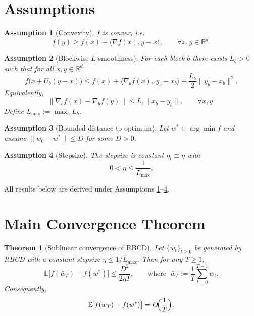 \documentclass[11pt]{article}
\newtheorem{theorem}{Theorem}
\newtheorem{assumption}{Assumption}
\newcommand{\E}{\mathbb{E}}
\newcommand{\R}{\mathbb{R}}
\begin{document}
\section*{Assumptions}
\begin{assumption}[Convexity]\label{ass:convex}
$f$ is convex, i.e.
\[
f(y)\ge f(x)+\langle\nabla f(x),y-x\rangle,\qquad\forall x,y\in\R^{d}.
\]
\end{assumption}
\begin{assumption}[Blockwise $L$‑smoothness]\label{ass:smooth}
For each block $b$ there exists $L_b>0$ such that for all $x,y\in\R^{d}$
\[
f\bigl(x+U_{b}(y-x)\bigr)\le 
f(x)+\langle\nabla_{b}f(x),\,y_{b}-x_{b}\rangle
+\frac{L_b}{2}\|y_{b}-x_{b}\|^{2}.
\]
Equivalently,
\[
\|\nabla_{b}f(x)-\nabla_{b}f(y)\|\le L_b\|x_{b}-y_{b}\|,\qquad\forall x,y.
\]
Define $L_{\max}:=\max_{b}L_b$.
\end{assumption}
\begin{assumption}[Bounded distance to optimum]\label{ass:bounded}
Let $w^{*}\in\arg\min f$ and assume $\|w_0-w^{*}\|\le D$ for some $D>0$.
\end{assumption}
\begin{assumption}[Stepsize]\label{ass:stepsize}
The stepsize is constant $\eta_t\equiv\eta$ with
\[
0<\eta\le \frac{1}{L_{\max}}.
\]
\end{assumption}
All results below are derived under Assumptions \ref{ass:convex}–\ref{ass:stepsize}.

\section*{Main Convergence Theorem}
\begin{theorem}[Sublinear convergence of RBCD]\label{thm:sublinear}
Let $\{w_t\}_{t\ge0}$ be generated by RBCD with a constant stepsize
$\eta\le1/L_{\max}$. Then for any $T\ge1$,
\[
\E\!\bigl[f(\bar w_T)-f(w^{*})\bigr]\le
\frac{D^{2}}{2\eta T},
\qquad\text{where }\;
\bar w_T:=\frac{1}{T}\sum_{t=0}^{T-1}w_t .
\]
Consequently,
\[
\E\!\bigl[f(w_T)-f(w^{*})\bigr]=O\!\Bigl(\frac{1}{T}\Bigr).
\]
\end{theorem}

\end{document}

